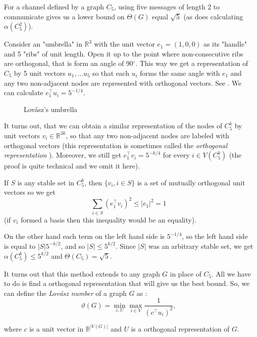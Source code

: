 For a channel defined by a graph $C_5$, using five messages of length 2 to communicate gives us a lower bound on $\Theta(G)$ equal $\sqrt{5}$ (as does calculating $\alpha(C_5^2)$).

Consider an "umbrella" in $\mathbb{R}^3$ with the unit vector $e_1 = (1, 0, 0)$ as its "handle" and 5 "ribs" of unit length.  Open it up to the point where non-consecutive ribs are orthogonal, that is form an angle of 90$^\circ$. This way we get a representation of $C_5$ by 5 unit vectors $u_1, \ldots u_5$ so that each $u_i$ forms the same angle with $e_1$ and any two non-adjacent nodes are represented with orthogonal vectors. See . We can calculate $e_1^\intercal u_i = 5 ^ {-1/4}$.

\begin{wrapfigure}{l}{0.4\textwidth}
  
  \caption{Lovász's umbrella}
  \label{fig:umbrella}
\end{wrapfigure}

It turns out, that we can obtain a similar representation of the nodes of $C_5^k$ by unit vectors $v_i \in \mathbb{R}^{3k}$, so that any two non-adjacent nodes are labeled with orthogonal vectors (this representation is sometimes called the \emph{orthogonal representation} \cite{Lovsz1989Orthogonal}). Moreover, we still get $e_1^\intercal v_i = 5^{-k/4}$ for every $i \in V(C_5^k)$ (the proof is quite technical and we omit it here).

If $S$ is any stable set in $C_5^k$, then $\{v_i, i \in S\}$ is a set of mutually orthogonal unit vectors so we get 
$$\sum\limits_{i\in S}(e_1^\intercal v_i)^2 \leq |e_1|^2 = 1$$
(if $v_i$ formed a basis then this inequality would be an equality).

On the other hand each term on the left hand side is $5^{-1/4}$, so the left hand side is equal to $|S|5^{-k/2}$, and so $|S| \leq 5^{k/2}$. Since $|S|$ was an arbitrary stable set, we get $\alpha(C_5^k) \leq 5 ^{k/2}$ and $\Theta(C_5) = \sqrt{5}$.

It turns out that this method extends to any graph $G$ in place of $C_5$. All we have to do is find a orthogonal representation that will give us the best bound. So, we can define the \emph{Lovász number} of a graph $G$ as :
$$\vartheta(G) = \min\limits_{c,U} \max\limits_{i\in V} \frac{1}{(c^\intercal u_i)^2},$$

\noindent where $c$ is a unit vector in $\mathbb{R}^{|V(G)|}$ and $U$ is a orthogonal representation of $G$.

